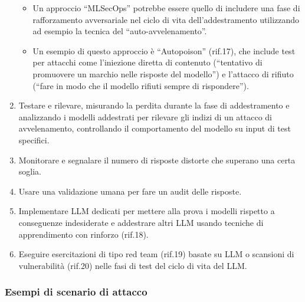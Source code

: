\documentclass[
]{article}
\providecommand{\tightlist}{%
  \setlength{\itemsep}{0pt}\setlength{\parskip}{0pt}}
\begin{document}
\begin{enumerate}
  \begin{itemize}
  \tightlist
  \item
    Un approccio ``MLSecOps'' potrebbe essere quello di includere una
    fase di rafforzamento avversariale nel ciclo di vita
    dell'addestramento utilizzando ad esempio la tecnica del
    ``auto-avvelenamento''.
  \item
    Un esempio di questo approccio è ``Autopoison'' (rif.17), che
    include test per attacchi come l'iniezione diretta di contenuto
    (``tentativo di promuovere un marchio nelle risposte del modello'')
    e l'attacco di rifiuto (``fare in modo che il modello rifiuti sempre
    di rispondere'').
  \end{itemize}
\item
  Testare e rilevare, misurando la perdita durante la fase di
  addestramento e analizzando i modelli addestrati per rilevare gli
  indizi di un attacco di avvelenamento, controllando il comportamento
  del modello su input di test specifici.
\item
  Monitorare e segnalare il numero di risposte distorte che superano una
  certa soglia.
\item
  Usare una validazione umana per fare un audit delle risposte.
\item
  Implementare LLM dedicati per mettere alla prova i modelli rispetto a
  conseguenze indesiderate e addestrare altri LLM usando tecniche di
  apprendimento con rinforzo (rif.18).
\item
  Eseguire esercitazioni di tipo red team (rif.19) basate su LLM o
  scansioni di vulnerabilità (rif.20) nelle fasi di test del ciclo di
  vita del LLM.
\end{enumerate}

\subsubsection{Esempi di scenario di
attacco}\label{esempi-di-scenario-di-attacco}
\end{document}
